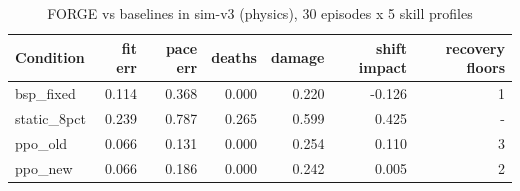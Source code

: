 \begin{table}[ht]
\centering
\small
\begin{tabular}{lrrrrrr}
\toprule
Condition & fit err & pace err & deaths & damage & shift impact & recovery floors \\
\midrule
bsp\_fixed & 0.114 & 0.368 & 0.000 & 0.220 & -0.126 & 1 \\
static\_8pct & 0.239 & 0.787 & 0.265 & 0.599 & 0.425 & - \\
ppo\_old & 0.066 & 0.131 & 0.000 & 0.254 & 0.110 & 3 \\
ppo\_new & 0.066 & 0.186 & 0.000 & 0.242 & 0.005 & 2 \\
\bottomrule
\end{tabular}
\caption{FORGE vs baselines in sim-v3 (physics), 30 episodes x 5 skill profiles}
\label{tab:baselines_old_sim}
\end{table}
